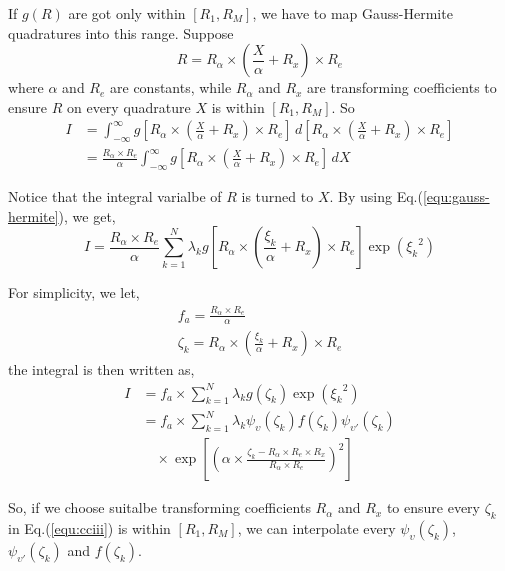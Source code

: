 \documentclass[aps,pra,groupedaddress,
                amsfonts,amssymb,
                preprint
    ]{revtex4}
\newcommand{\molnwv}{\psi}
\newcommand{\vibqu}{\upsilon}
\begin{document}
If $g(R)$ are got only within $[R_1, R_M]$, we have to map Gauss-Hermite
quadratures into this range. Suppose
\begin{equation}
R = R_\alpha\times\left(\frac{X}{\alpha}+R_x\right)\times R_e
\end{equation}
where $\alpha$ and $R_e$ are constants, while $R_\alpha$ and $R_x$ are
transforming coefficients to ensure $R$ on every quadrature $X$ is within
$[R_1, R_M]$. So
\begin{equation}
\begin{split}
I &=
\int_{-\infty}^{\infty}g\left[R_\alpha\times\left(\frac{X}{\alpha}+R_x\right)\times
  R_e\right]\,d\left[R_\alpha\times\left(\frac{X}{\alpha}+R_x\right)\times R_e\right] \\
&= \frac{R_\alpha\times
  R_e}{\alpha}\int_{-\infty}^{\infty}g\left[R_\alpha\times\left(\frac{X}{\alpha}+R_x\right)\times R_e\right]\,dX 
\end{split}
\end{equation}

Notice that the integral varialbe of $R$ is turned to $X$. By using
Eq.(\ref{equ:gauss-hermite}), we get,
\begin{equation}
I = \frac{R_\alpha\times R_e}{\alpha}\sum_{k=1}^{N}\lambda_k g\left[R_\alpha\times\left(\frac{\xi_k}{\alpha}+R_x\right)\times R_e\right]\exp\left({\xi_k}^2\right)
\end{equation}

For simplicity, we let,
\begin{gather}
f_a = \frac{R_\alpha\times R_e}{\alpha} \\
\zeta_k = R_\alpha\times\left(\frac{\xi_k}{\alpha}+R_x\right)\times R_e
\end{gather}
the integral is then written as,
\begin{equation}  \label{equ:cciii}
\begin{split}
I &=
f_a\times\sum_{k=1}^{N}\lambda_kg(\zeta_k)\exp\left({\xi_k}^2\right)
\\
&=
f_a\times\sum_{k=1}^{N}\lambda_k\molnwv_{\vibqu}(\zeta_k)f(\zeta_k)\molnwv_{\vibqu'}(\zeta_k) \\
&\quad\times\exp\left[\left(\alpha\times\frac{\zeta_k-R_\alpha\times
    R_e\times R_x}{R_\alpha\times R_e}\right)^2\right]
\end{split}
\end{equation}

So, if we choose suitalbe transforming coefficients $R_\alpha$ and $R_x$
to ensure every $\zeta_k$ in Eq.(\ref{equ:cciii}) is within $[R_1,R_M]$,
we can interpolate every $\molnwv_{\vibqu}(\zeta_k)$,
$\molnwv_{\vibqu'}(\zeta_k)$ and $f(\zeta_k)$.
\end{document}
